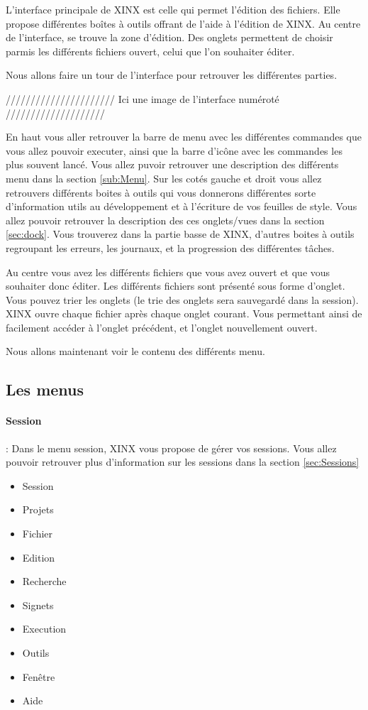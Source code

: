 \documentclass[a4paper,10pt,twoside]{book}
\begin{document}
L'interface principale de XINX est celle qui permet l'édition des fichiers. Elle propose différentes boîtes à outils offrant de l'aide à l'édition de XINX. Au centre de l'interface, se trouve la zone d'édition. Des onglets permettent de choisir parmis les différents fichiers ouvert, celui que l'on souhaiter éditer.

Nous allons faire un tour de l'interface pour retrouver les différentes parties.

////////////////////// Ici une image de l'interface numéroté ////////////////////


En haut vous aller retrouver la barre de menu avec les différentes commandes que vous allez pouvoir executer, ainsi que la barre d'icône avec les commandes les plus souvent lancé. Vous allez puvoir retrouver une description des différents menu dans la section \ref{sub:Menu}. Sur les cotés gauche et droit vous allez retrouvers différents boites à outils qui vous donnerons différentes sorte d'information utils au développement et à l'écriture de vos feuilles de style. Vous allez pouvoir retrouver la description des ces onglets/vues dans la section \ref{sec:dock}. Vous trouverez dans la partie basse de XINX, d'autres boites à outils regroupant les erreurs, les journaux, et la progression des différentes tâches.

Au centre vous avez les différents fichiers que vous avez ouvert et que vous souhaiter donc éditer. Les différents fichiers sont présenté sous forme d'onglet. Vous pouvez trier les onglets (le trie des onglets sera sauvegardé dans la session). XINX ouvre chaque fichier après chaque onglet courant. Vous permettant ainsi de facilement accéder à l'onglet précédent, et l'onglet nouvellement ouvert.

Nous allons maintenant voir le contenu des différents menu.


\subsection{Les menus}
\label{sub:menu}

\paragraph{Session} : Dans le menu session, XINX vous propose de gérer vos sessions. Vous allez pouvoir retrouver plus d'information sur les sessions dans la section \ref{sec:Sessions}

\begin{itemize}
  \item Session 
  \item Projets
  \item Fichier
  \item Edition
  \item Recherche
  \item Signets
  \item Execution
  \item Outils
  \item Fenêtre
  \item Aide
\end{itemize}
\end{document}

